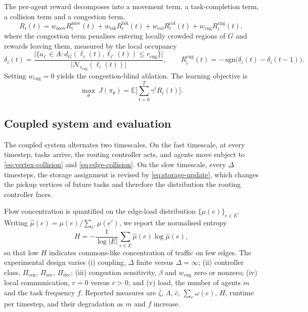 The per-agent reward decomposes into a movement term, a task-completion
term, a collision term and a congestion term,
\begin{equation}
  R_i(t)
  = w_{\mathrm{mov}} R_i^{\mathrm{mov}}(t)
  + w_{\mathrm{tsk}} R_i^{\mathrm{tsk}}(t)
  + w_{\mathrm{col}} R_i^{\mathrm{col}}(t)
  + w_{\mathrm{cng}} R_i^{\mathrm{cng}}(t),
  \label{eq:reward}
\end{equation}
where the congestion term penalises entering locally crowded regions of
\( G \) and rewards leaving them, measured by the local occupancy
\begin{equation}
  \delta_i(t)
  = \frac{\big| \{ a_{i'} \in A : d_G(\ell_i(t), \ell_{i'}(t)) \leq r_{\mathrm{cng}} \} \big|}
         {\big| \mathcal{N}_{r_{\mathrm{cng}}}(\ell_i(t)) \big|},
  \qquad
  R_i^{\mathrm{cng}}(t) = -\,\mathrm{sgn}\big( \delta_i(t) - \delta_i(t-1) \big).
  \label{eq:congestion-reward}
\end{equation}
Setting \( w_{\mathrm{cng}} = 0 \) yields the congestion-blind ablation.
The learning objective is
\begin{equation}
  \max_{\theta}\ J(\pi_\theta)
  = \mathbb{E}\Big[ \textstyle\sum_{t=0}^{T} \gamma^t R_i(t) \Big].
\end{equation}

\subsection{Coupled system and evaluation}

The coupled system alternates two timescales. On the fast timescale, at every
timestep, tasks arrive, the routing controller acts, and agents move subject
to \eqref{eq:vertex-collision} and \eqref{eq:edge-collision}. On the slow
timescale, every \( \Delta \) timesteps, the storage assignment is revised by
\eqref{eq:storage-update}, which changes the pickup vertices of future tasks
and therefore the distribution the routing controller faces.

Flow concentration is quantified on the edge-load distribution
\( \{ \mu(e) \}_{e \in E} \). Writing \( \hat{\mu}(e) = \mu(e) / \sum_{e'} \mu(e') \),
we report the normalised entropy
\begin{equation}
  H = -\frac{1}{\log |E|} \sum_{e \in E} \hat{\mu}(e) \log \hat{\mu}(e),
  \label{eq:entropy}
\end{equation}
so that low \( H \) indicates commons-like concentration of traffic on few
edges. The experimental design varies (i) coupling, \( \Delta \) finite versus
\( \Delta = \infty \); (ii) controller class, \( \Pi_{\mathrm{cen}} \),
\( \Pi_{\mathrm{sec}} \), \( \Pi_{\mathrm{dec}} \); (iii) congestion sensitivity,
\( \beta \) and \( w_{\mathrm{cng}} \) zero or nonzero; (iv) local communication,
\( r = 0 \) versus \( r > 0 \); and (v) load, the number of agents \( m \) and
the task frequency \( f \). Reported measures are
\( \bar{\zeta} \), \( \Lambda \), \( \bar{c} \), \( \sum_e \omega(e) \), \( H \),
runtime per timestep, and their degradation as \( m \) and \( f \) increase.


